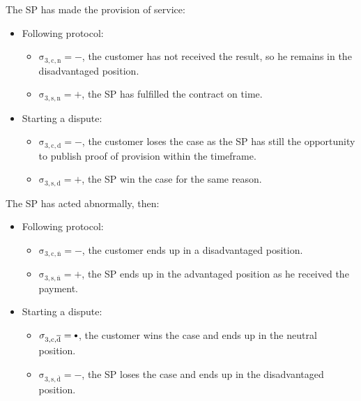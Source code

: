 \documentclass{ieeeaccess}
\newcommand\sbullet[1][.75]{\mathbin{\ThisStyle{\vcenter{\hbox{%
  \scalebox{#1}{$\SavedStyle\bullet$}}}}}%
}
\begin{document}
The SP has made the provision of service:

\begin{itemize}
\item
  Following protocol:

  \begin{itemize}
  
  \item
    \(\operatorname{\sigma_{3, c, n} = -}\), the customer has not received the result, so he remains in the disadvantaged position. 
  \item
    \(\operatorname{\sigma_{3, s, n} = +}\), the SP has fulfilled the contract on time.
  \end{itemize}
\item
  Starting a dispute:

  \begin{itemize}
  
  \item
    \(\operatorname{\sigma_{3, c, d} = -}\), the customer loses the case as the SP has still the opportunity to publish proof of provision within the timeframe. 
  \item
    \(\operatorname{\sigma_{3, s, d} = +}\), the SP win the case for the same reason.
  \end{itemize}
\end{itemize}

The SP has acted abnormally, then:

\begin{itemize}
\item
  Following protocol:

  \begin{itemize}
  
  \item
    \(\operatorname{\sigma_{3, c, \overline{n}} = -}\), the customer ends up in a disadvantaged position.
  \item
    \(\operatorname{\sigma_{3, s, \overline{n}} = +}\), the SP ends up in the advantaged position as he received the payment. 
  \end{itemize}
\item
  Starting a dispute:

  \begin{itemize}
  
  \item
    \(\operatorname{\sigma_{3, c, \overline{d}} = \sbullet}\), the customer wins the case and ends up in the neutral position.
  \item
    \(\operatorname{\sigma_{3, s, \overline{d}} = -}\), the SP loses the case and ends up in the disadvantaged position. 
  \end{itemize}
\end{itemize}
\end{document}
